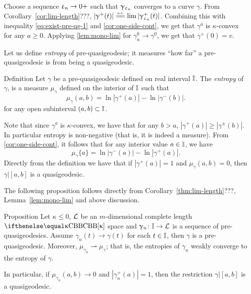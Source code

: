 \smallskip

Choose a sequence $\eps_n\to0+$ such that $\upgamma_{\upvarepsilon_n}$ converges to a curve $\gamma$.
From Corollary~\ref{cor:lim-length}???, $|\gamma^+(t)|\ae\lim|\gamma_{\eps_n}^+(t)|$.
Combining this with inequality \ref{eq:exist-pre-qg-1} and \ref{cor:one-side-cont}, we get that
$\gamma^{a}$
is $\kappa$-convex for any $a\ge0$.
Applying \ref{lem:mono-lim} for $\gamma_n^0\to \gamma^0$, we get that $\gamma^+(0)=v$.
\qeds



Let us  define \emph{entropy} of pre-\nospace quasigeodesic;
it measures ``how far''
a pre-quasigeodesic is from being a quasigeodesic.

\begin{thm}{Definition}\label{def:entropy}
Let $\gamma$ be a pre-quasigeodesic defined on real interval $\mathbb{I}$.
The \emph{entropy} of $\gamma$,  is a measure $\mu_\gamma$ defined  on the interior of $\mathbb{I}$
such that
\[ \mu_\gamma (a,b)=\ln |\gamma^+(a)|-\ln |\gamma^-(b)|.\]
for any open subinterval $(a,b)\subset\II$.
\end{thm}

Note that since $\gamma^a$ is $\kappa$-convex, we have that for any $b>a$, $|\gamma^+(a)|\ge|\gamma^\pm(b)|$.
In particular entropy is non-negative (that is, it is indeed a measure).
From \ref{cor:one-side-cont}, it follows that for any interior value $a\in\II$, we have
\[\mu_\gamma\{a\}=\ln|\gamma^-(a)|-\ln|\gamma^+(a)|.\]
Directly from the definition we have that if $|\gamma^+(a)|=1$ and $\mu_\gamma(a,b)=0$, then $\gamma|[a,b]$ is a quasigeodesic.


The following proposition follows directly from 
Corollary~\ref{thm:lim-length}???, 
Lemma~\ref{lem:mono-lim} 
and above discussion.


\begin{thm}{Proposition}\label{lim-entropy}
Let $\kappa\le 0$, 
$\mathcal{L}$ be an $m$-dimensional complete length $\Alex\kappa$ space
and $\gamma_n\:\II\to \spc{L}$ is a sequence of pre-quasigeodesics.
Assume $\gamma_n(t)\to\gamma(t)$ for each $t\in \II$,
then $\gamma$ is a pre-quasigeodesic.
Moreover, $\mu_{\gamma_n}\rightharpoonup\mu_\gamma$; 
that is, the entropies of $\gamma_n$ weakly converge to the entropy of $\gamma$.

In particular, 
if $\mu_{\gamma_n}(a,b)\to0$ and $|\gamma_n^+(a)|=1$, then the restriction $\gamma|[a,b]$ is a quasigeodesic.
\end{thm}




